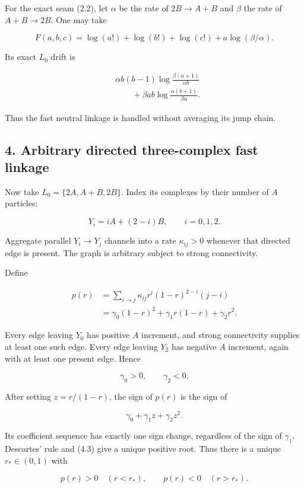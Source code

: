 For the exact seam (2.2), let \(\alpha\) be the rate of \(2B\to A+B\)
and \(\beta\) the rate of \(A+B\to2B\). One may take

\[
 F(a,b,c)=\log(a!)+\log(b!)+\log(c!)
          +a\log(\beta/\alpha).
\tag{3.9}
\]

Its exact \(L_0\) drift is

\[
\begin{split}
 &\alpha b(b-1)\log\frac{\beta(a+1)}{\alpha b}\\
 &\qquad+\beta ab\log\frac{\alpha(b+1)}{\beta a}.
\end{split}
\tag{3.10}
\]

Thus the fast neutral linkage is handled without averaging its jump
chain.

\subsection{4. Arbitrary directed three-complex fast
linkage}

Now take \(L_0=\{2A,A+B,2B\}\). Index its complexes by their number of
\(A\) particles:

\[
 Y_i=iA+(2-i)B,\qquad i=0,1,2.
\tag{4.1}
\]

Aggregate parallel \(Y_i\to Y_j\) channels into a rate \(\kappa_{ij}>0\)
whenever that directed edge is present. The graph is arbitrary subject
to strong connectivity.

Define

\[
\begin{split}
 p(r)
 &=\sum_{i\to j}\kappa_{ij}r^i(1-r)^{2-i}(j-i)\\
 &=\gamma_0(1-r)^2+\gamma_1r(1-r)+\gamma_2r^2.
\end{split}
\tag{4.2}
\]

Every edge leaving \(Y_0\) has positive \(A\) increment, and strong
connectivity supplies at least one such edge. Every edge leaving \(Y_2\)
has negative \(A\) increment, again with at least one present edge.
Hence

\[
 \gamma_0>0,\qquad\gamma_2<0.
\tag{4.3}
\]

After setting \(z=r/(1-r)\), the sign of \(p(r)\) is the sign of

\[
 \gamma_0+\gamma_1z+\gamma_2z^2.
\tag{4.4}
\]

Its coefficient sequence has exactly one sign change, regardless of the
sign of \(\gamma_1\). Descartes' rule and (4.3) give a unique positive
root. Thus there is a unique \(r_*\in(0,1)\) with

\[
 p(r)>0\quad(r<r_*),\qquad p(r)<0\quad(r>r_*).
\tag{4.5}
\]

